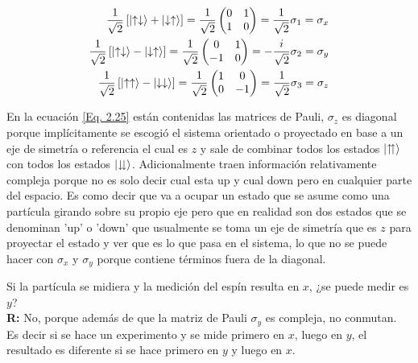 \documentclass[11pt,fleqn]{book}
\begin{document}
\begin{equation}
\begin{split}
    \frac{1}{\sqrt{2}}\left[\ket{\uparrow\downarrow}+\ket{\downarrow\uparrow}\right]=\frac{1}{\sqrt{2}}\begin{pmatrix}
                0 & 1 \\
                1 & 0
    \end{pmatrix}= \frac{1}{\sqrt{2}}\sigma_{1}=\sigma_{x}\\
    \frac{1}{\sqrt{2}}\left[\ket{\uparrow\downarrow}-\ket{\downarrow\uparrow}\right]=\frac{1}{\sqrt{2}}\begin{pmatrix}
                0 & 1 \\
                -1 & 0
    \end{pmatrix}= -\frac{i}{\sqrt{2}}\sigma_{2}=\sigma_{y}\\
    \frac{1}{\sqrt{2}}\left[\ket{\uparrow\uparrow}-\ket{\downarrow\downarrow}\right]=\frac{1}{\sqrt{2}}\begin{pmatrix}
                1 & 0 \\
                0 & -1
    \end{pmatrix}= \frac{1}{\sqrt{2}}\sigma_{3}=\sigma_{z}
\end{split}
\label{Eq. 2.25}
\end{equation}

En la ecuación \ref{Eq. 2.25} están contenidas las matrices de Pauli, $\sigma_{z}$ es diagonal porque implícitamente se escogió el sistema orientado o proyectado en base a un eje de simetría o referencia el cual es $z$ y sale de combinar todos los estados $\ket{\upuparrows}$ con todos los estados $\ket{\downdownarrows}$. Adicionalmente traen información relativamente compleja porque no es solo decir cual esta up y cual down pero en cualquier parte del espacio. Es como decir que va a ocupar un estado que se asume  como una partícula girando sobre su propio eje pero que en realidad son dos estados que se denominan 'up' o 'down' que usualmente se toma un eje de simetría que es $z$ para proyectar el estado y ver que es lo que pasa en el sistema, lo que no se puede hacer con $\sigma_{x}$ y $\sigma_{y}$ porque contiene términos fuera de la diagonal.

\begin{exercise}
Si la partícula se midiera y la medición del espín resulta en $x$, ¿se puede medir es $y$?\\

\textbf{R:} No, porque además de que la matriz de Pauli $\sigma_{y}$ es compleja, no conmutan. Es decir si se hace un experimento y se mide primero en $x$, luego en $y$, el resultado es diferente si se hace primero en $y$ y luego en $x$.
\end{exercise}
\end{document}
